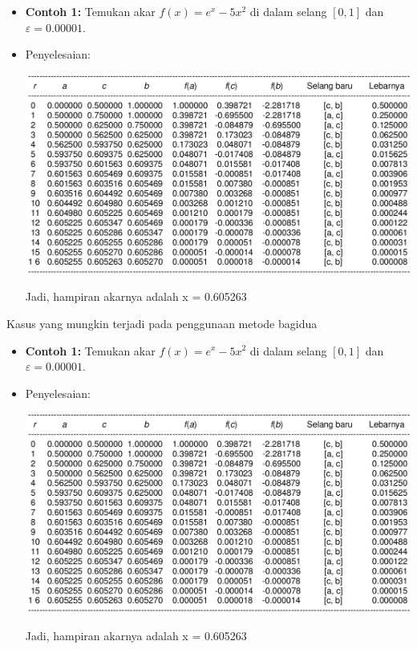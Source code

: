 \documentclass[pdflatex,compress]{beamer}
\begin{document}
\begin{frame}
	\begin{itemize}
		\item \textbf{Contoh 1:} Temukan akar $ f(x) = e^x - 5x^2 $ di dalam selang $ [0, 1] $ dan $ \varepsilon = 0.00001 $.
		\item Penyelesaian:
		\begin{center}
			\includegraphics[width=0.7\linewidth]{img/img07.png}
		\end{center}
		Jadi, hampiran akarnya adalah x = 0.605263
	\end{itemize}
\end{frame}

\begin{frame}
	Kasus yang mungkin terjadi pada penggunaan metode bagidua
	\begin{itemize}
		\item \textbf{Contoh 1:} Temukan akar $ f(x) = e^x - 5x^2 $ di dalam selang $ [0, 1] $ dan $ \varepsilon = 0.00001 $.
		\item Penyelesaian:
		\begin{center}
			\includegraphics[width=0.7\linewidth]{img/img07.png}
		\end{center}
		Jadi, hampiran akarnya adalah x = 0.605263
	\end{itemize}
\end{frame}
\end{document}
